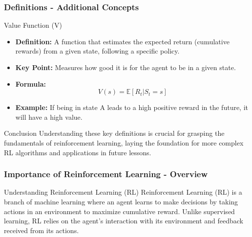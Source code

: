 \documentclass[aspectratio=169]{beamer}
\begin{document}
\begin{frame}[fragile]
    \frametitle{Definitions - Additional Concepts}
    \begin{block}{Value Function (V)}
        \begin{itemize}
            \item \textbf{Definition:} A function that estimates the expected return (cumulative rewards) from a given state, following a specific policy.
            \item \textbf{Key Point:} Measures how good it is for the agent to be in a given state.
            \item \textbf{Formula:} 
                \[
                V(s) = \mathbb{E}[R_t | S_t=s]
                \]
            \item \textbf{Example:} If being in state A leads to a high positive reward in the future, it will have a high value.
        \end{itemize}
    \end{block}

    \begin{block}{Conclusion}
        Understanding these key definitions is crucial for grasping the fundamentals of reinforcement learning, laying the foundation for more complex RL algorithms and applications in future lessons.
    \end{block}
\end{frame}

\begin{frame}[fragile]
  \frametitle{Importance of Reinforcement Learning - Overview}
  \begin{block}{Understanding Reinforcement Learning (RL)}
    Reinforcement Learning (RL) is a branch of machine learning where an agent learns to make decisions by taking actions in an environment to maximize cumulative reward. Unlike supervised learning, RL relies on the agent's interaction with its environment and feedback received from its actions.
  \end{block}
\end{frame}
\end{document}
